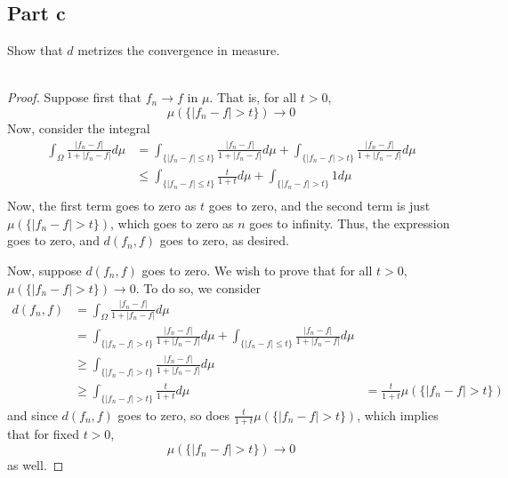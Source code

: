 \documentclass[fontsize=11pt]{scrartcl} %
\numberwithin{equation}{section} %
\numberwithin{figure}{section} %
\numberwithin{table}{section} %
\begin{document}
\subsection*{Part c}
Show that $d$ metrizes the convergence in measure.
\\
\\
\begin{proof}
Suppose first that $f_n\to f$ in $\mu$. That is, for all $t>0$,
    \[
        \mu(\{|f_n-f|>t\})\to 0
    \]
    Now, consider the integral
    \[
        \begin{aligned}
            \int_{\Omega}\frac{|f_n-f|}{1+|f_n-f|}d\mu
            &= \int_{\{|f_n-f|\leq t\}}\frac{|f_n-f|}{1+|f_n-f|}d\mu +
            \int_{\{|f_n-f|>t\}}\frac{|f_n-f|}{1+|f_n-f|}d\mu\\
            &\leq \int_{\{|f_n-f|\leq t\}}\frac{t}{1+t}d\mu +
            \int_{\{|f_n-f|>t\}}1d\mu\\
        \end{aligned}
    \]
    Now, the first term goes to zero as $t$ goes to zero, and the second term
    is just $\mu(\{|f_n-f|>t\})$, which goes to zero as $n$ goes to infinity.
    Thus, the expression goes to zero, and $d(f_n,f)$ goes to zero, as desired.

    Now, suppose $d(f_n,f)$ goes to zero. We wish to prove that for all $t>0$,
    $\mu(\{|f_n-f| > t\})\to 0$. To do so, we consider
    \[
        \begin{aligned}
            d(f_n,f) &= \int_{\Omega}\frac{|f_n-f|}{1+|f_n-f|}d\mu\\
            &= \int_{\{|f_n-f|>t\}}\frac{|f_n-f|}{1+|f_n-f|}d\mu +
                \int_{\{|f_n-f|\leq t\}}\frac{|f_n-f|}{1+|f_n-f|}d\mu\\
            &\geq\int_{\{|f_n-f|>t\}}\frac{|f_n-f|}{1+|f_n-f|}d\mu\\
            &\geq\int_{\{|f_n-f|>t\}}\frac{t}{1+t}d\mu
            &=\frac{t}{1+t}\mu(\{|f_n-f|>t\})
        \end{aligned}
    \]
    and since $d(f_n,f)$ goes to zero, so does
    $\frac{t}{1+t}\mu(\{|f_n-f|>t\})$, which implies that for fixed $t>0$,
    \[
        \mu(\{|f_n-f|>t\})\to 0
    \]
    as well.
\end{proof}

\end{document}

